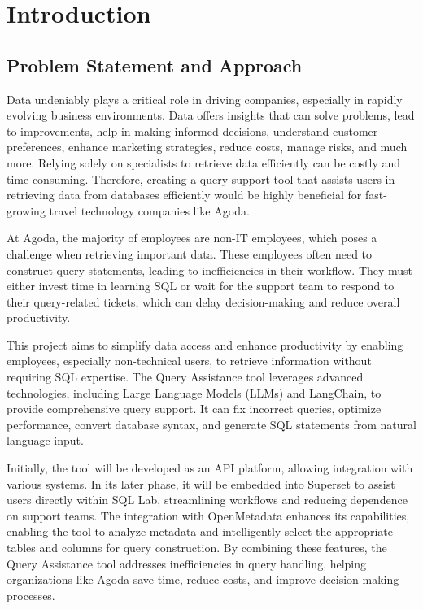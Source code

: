 \chapter{Introduction}



\section{Problem Statement and Approach} 

Data undeniably plays a critical role in driving companies, especially in rapidly evolving business environments. Data offers insights that can solve problems, lead to improvements, help in making informed decisions, understand customer preferences, enhance marketing strategies, reduce costs, manage risks, and much more. Relying solely on specialists to retrieve data efficiently can be costly and time-consuming. Therefore, creating a query support tool that assists users in retrieving data from databases efficiently would be highly beneficial for fast-growing travel technology companies like Agoda.

At Agoda, the majority of employees are non-IT employees, which poses a challenge when retrieving important data. These employees often need to construct query statements, leading to inefficiencies in their workflow. They must either invest time in learning SQL or wait for the support team to respond to their query-related tickets, which can delay decision-making and reduce overall productivity.

This project aims to simplify data access and enhance productivity by enabling employees, especially non-technical users, to retrieve information without requiring SQL expertise. The Query Assistance tool leverages advanced technologies, including Large Language Models (LLMs) and LangChain, to provide comprehensive query support. It can fix incorrect queries, optimize performance, convert database syntax, and generate SQL statements from natural language input.

Initially, the tool will be developed as an API platform, allowing integration with various systems. In its later phase, it will be embedded into Superset to assist users directly within SQL Lab, streamlining workflows and reducing dependence on support teams. The integration with OpenMetadata enhances its capabilities, enabling the tool to analyze metadata and intelligently select the appropriate tables and columns for query construction. By combining these features, the Query Assistance tool addresses inefficiencies in query handling, helping organizations like Agoda save time, reduce costs, and improve decision-making processes.

